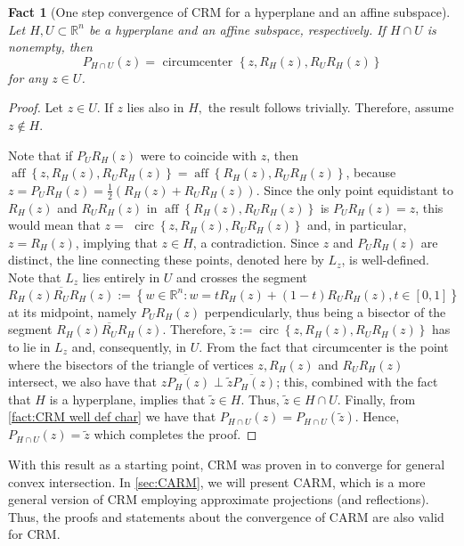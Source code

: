 \documentclass[smallextended,numbook,nospthms]{svjour3}
\theoremstyle{plain}
\newtheorem{fact}[theorem]{Fact}
\theoremstyle{definition}
\def\RR{\mathds R}
\begin{document}
\begin{fact}[One step convergence of CRM for a hyperplane and an affine subspace]\label{fact:CRM 1 step conv hp aff} Let $H, U \subset \RR^{n}$ be a hyperplane and an affine subspace, respectively. If $H \cap U$ is nonempty, then
\[
P_{H \cap U}(z)=\text { circumcenter }\left\{z, R_{H}(z), R_{U} R_{H}(z)\right\}
\]
for any $z \in U$.
\end{fact}
\begin{proof}
Let $z \in U$. If $z$ lies also in $H,$ the result follows trivially. Therefore, assume $z \notin H$.

Note that if $P_{U} R_{H}(z)$ were to coincide with $z$, then $\operatorname{aff}\left\{z, R_{H}(z), R_{U} R_{H}(z)\right\}=\operatorname{aff}\left\{R_{H}(z), R_{U} R_{H}(z)\right\}$, because $z=P_{U}R_{H}(z)=\frac{1}{2}\left(R_{H}(z)+R_{U} R_{H}(z)\right)$. Since the only point equidistant to $R_{H}(z)$ and $R_{U} R_{H}(z)$ in $\operatorname{aff}\left\{R_{H}(z), R_{U} R_{H}(z)\right\}$ is $P_{U} R_{H}(z)=z$, this would mean that $z=$ $\operatorname{circ}\left\{z, R_{H}(z), R_{U} R_{H}(z)\right\}$ and, in particular, $z=R_{H}(z)$, implying that $z \in H$, a contradiction. Since $z$ and $P_{U} R_{H}(z)$ are distinct, the line connecting these points, denoted here by $L_{z}$, is well-defined. Note that $L_{z}$ lies entirely in $U$ and crosses the segment $\overline{R_{H}(z) R_{U} R_{H}(z)}:=\left\{w \in \RR^{n}: w=t R_{H}(z)+(1-t) R_{U} R_{H}(z), t \in[0,1]\right\}$ at its midpoint, namely $P_{U} R_{H}(z)$ perpendicularly, thus being a bisector of the segment $\overline{R_{H}(z) R_{U} R_{H}(z)}$. Therefore, $\tilde{z}:=\operatorname{circ}\left\{z, R_{H}(z), R_{U} R_{H}(z)\right\}$ has to lie in $L_{z}$ and, consequently, in $U$. From the fact that circumcenter is the point where the bisectors of the triangle of vertices $z, R_{H}(z)$ and $R_{U} R_{H}(z)$ intersect, we also have that $\overline{z P_{H}(z)} \perp \overline{\tilde{z} P_{H}(z)}$; this, combined with the fact that $H$ is a hyperplane, implies that $\tilde{z} \in H$. Thus, $\tilde{z} \in H \cap U$.
Finally, from \cref{fact:CRM well def char} we have that $P_{H \cap U}(z)=P_{H \cap U}(\tilde{z})$. Hence, $P_{H \cap U}(z)=\tilde{z}$ which completes the proof.
\end{proof}

With this result as a starting point, CRM was proven in \cite{Behling:2020} to converge for general convex intersection. In \cref{sec:CARM}, we will present CARM, which is a more general version of CRM employing approximate projections (and reflections). Thus, the proofs and statements about the convergence of CARM are also valid for CRM.
\end{document}
